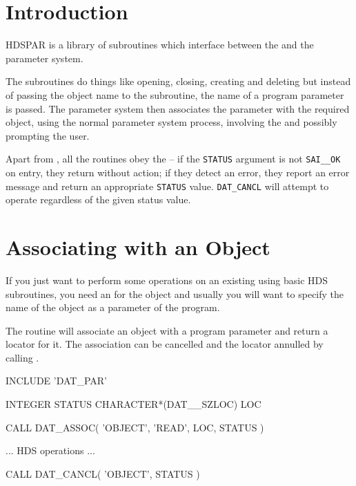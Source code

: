 \documentclass[twoside,11pt,nolof]{starlink}
\providecommand{\STARURL}{http://www.starlink.ac.uk/}
\begin{document}
\scfrontmatter

\section{Introduction}
HDSPAR is a library of subroutines which
interface between the
\htmladdnormallink{Starlink}{\STARURL}
 and the
 parameter system.

The subroutines do things like opening, closing, creating and deleting
but instead of passing the
object name to the subroutine, the name of a program parameter is passed.
The parameter system then associates the parameter with the required object,
using the normal parameter system process, involving the
and possibly prompting the user.

Apart from
,
all the routines obey the
-- if the \texttt{STATUS} argument is not \texttt{SAI\_\_OK} on entry,
they return without action;
if they detect an error, they report an error message and return an
appropriate \texttt{STATUS} value.
\texttt{DAT\_CANCL} will attempt to operate regardless of the given status
value.

\section{Associating with an Object}
If you just want to perform some operations on an existing
using basic HDS subroutines, you need an
for the object and usually you will want to specify the name of the object as
a parameter of the program.

The
routine will associate an object with a program parameter and return a locator
for it.
The association can be cancelled and the locator annulled by calling
.

\begin{terminalv}
INCLUDE 'DAT_PAR'

INTEGER STATUS
CHARACTER*(DAT__SZLOC) LOC

CALL DAT_ASSOC( 'OBJECT', 'READ', LOC, STATUS )

... HDS operations ...

CALL DAT_CANCL( 'OBJECT', STATUS )
\end{terminalv}
\end{document}
